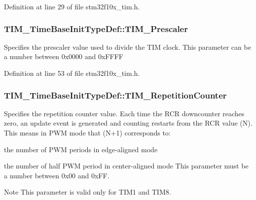 Definition at line 29 of file stm32f10x\+\_\+tim.\+h.

\subsubsection[{\texorpdfstring{T\+I\+M\+\_\+\+Prescaler}{TIM_Prescaler}}]{ T\+I\+M\+\_\+\+Time\+Base\+Init\+Type\+Def\+::\+T\+I\+M\+\_\+\+Prescaler}\hypertarget{struct_t_i_m___time_base_init_type_def_a6d3c8632780db819b2eb811e71ce251e}{}\label{struct_t_i_m___time_base_init_type_def_a6d3c8632780db819b2eb811e71ce251e}
Specifies the prescaler value used to divide the T\+IM clock. This parameter can be a number between 0x0000 and 0x\+F\+F\+FF 

Definition at line 53 of file stm32f10x\+\_\+tim.\+h.

\subsubsection[{\texorpdfstring{T\+I\+M\+\_\+\+Repetition\+Counter}{TIM_RepetitionCounter}}]{ T\+I\+M\+\_\+\+Time\+Base\+Init\+Type\+Def\+::\+T\+I\+M\+\_\+\+Repetition\+Counter}\hypertarget{struct_t_i_m___time_base_init_type_def_a5f3b3b2af2338a0f1d0be4bfaf602b72}{}\label{struct_t_i_m___time_base_init_type_def_a5f3b3b2af2338a0f1d0be4bfaf602b72}
Specifies the repetition counter value. Each time the R\+CR downcounter reaches zero, an update event is generated and counting restarts from the R\+CR value (N). This means in P\+WM mode that (N+1) corresponds to\+:
\begin{DoxyItemize}
\item the number of P\+WM periods in edge-\/aligned mode
\item the number of half P\+WM period in center-\/aligned mode This parameter must be a number between 0x00 and 0x\+FF. \begin{DoxyNote}{Note}
This parameter is valid only for T\+I\+M1 and T\+I\+M8. 
\end{DoxyNote}

\end{DoxyItemize}

